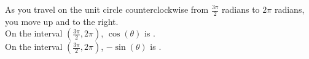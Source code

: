\documentclass{ximera}
\begin{document}
\begin{example}
\begin{question}
As you travel on the unit circle counterclockwise from $\frac{3\pi}{2}$ radians to $2\pi$ radians, you move up and to the right. \\


On the interval $\left (\frac{3\pi}{2}, 2\pi \right)$, $\cos(\theta)$ is . \\


On the interval $\left (\frac{3\pi}{2}, 2\pi \right)$, $-\sin(\theta)$ is . \\

\end{question}




















\end{example}
\end{document}
